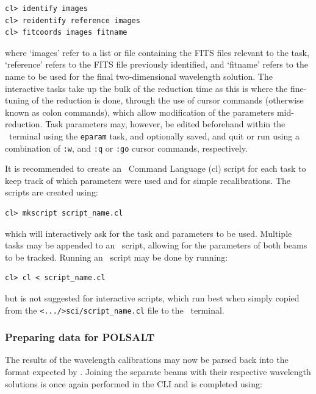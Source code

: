 \begin{verbatim}
cl> identify images
cl> reidentify reference images
cl> fitcoords images fitname
\end{verbatim}

\noindent where `images' refer to a list or file containing the \gls{FITS} files relevant to the task, `reference' refers to the \gls{FITS} file previously identified, and `fitname' refers to the name to be used for the final two-dimensional wavelength solution. The interactive tasks take up the bulk of the reduction time as this is where the fine-tuning of the reduction is done, through the use of cursor commands (otherwise known as colon commands), which allow modification of the parameters mid-reduction. Task parameters may, however, be edited beforehand within the \iraf\ terminal using the \texttt{eparam} task, and optionally saved, and quit or run using a combination of \texttt{:w}, and \texttt{:q} or \texttt{:go} cursor commands, respectively.
\prgph

It is recommended to create an \iraf\ Command Language (cl) script for each task to keep track of which parameters were used and for simple recalibrations. The scripts are created using:

\begin{verbatim}cl> mkscript script_name.cl\end{verbatim}

\noindent which will interactively ask for the task and parameters to be used. Multiple tasks may be appended to an \iraf\ script, allowing for the parameters of both beams to be tracked. Running an \iraf\ script may be done by running:

\begin{verbatim}cl> cl < script_name.cl\end{verbatim}

\noindent but is not suggested for interactive scripts, which run best when simply copied from the \texttt{<.../>sci/script\_name.cl} file to the \iraf\ terminal.


\subsubsection{Preparing data for POLSALT}

The results of the wavelength calibrations may now be parsed back into the format expected by \polsalt. Joining the separate beams with their respective wavelength solutions is once again performed in the \gls{CLI} and is completed using:


